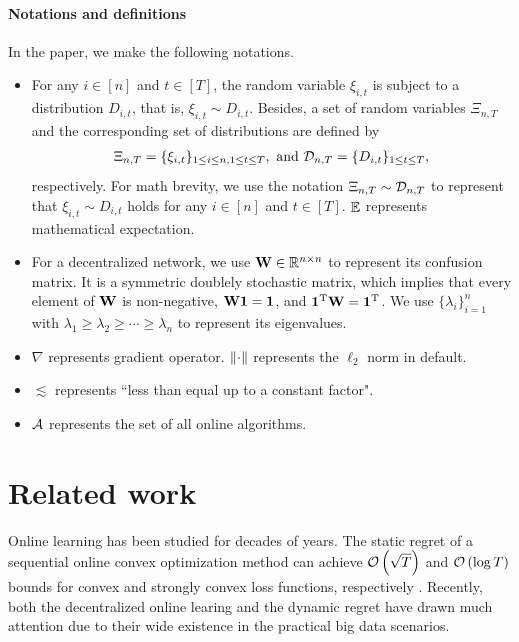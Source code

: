 \documentclass{article}
\begin{document}
\paragraph{Notations and definitions}
In the paper, we make the following notations.
\begin{itemize}
\item For any $i\in[n]$ and $t\in[T]$, the random variable $\xi_{i,t}$ is subject to a distribution $D_{i,t}$, that is, $\xi_{i,t} \sim D_{i,t}$. Besides, a set of random variables $\Xi_{n,T}$ and the corresponding set of distributions are defined by
\begin{align}
\nonumber
\Xi_{n,T} = \{ \xi_{i,t} \}_{1\le i \le n, 1 \le t \le T}, \text{~and~} \mathcal{D}_{n,T} = \{ D_{i,t} \}_{1 \le t \le T},
\end{align} respectively. For math brevity, we use the notation $\Xi_{n,T} \sim \mathcal{D}_{n,T}$ to represent that $\xi_{i,t} \sim D_{i,t}$ holds for any $i\in[n]$ and $t\in[T]$. $\mathop{\mathbb{E}}$ represents mathematical expectation.
\item For a decentralized network, we use ${\bf W} \in\mathbb{R}^{n\times n}$ to represent its confusion matrix. It is a symmetric doublely stochastic matrix, which implies that every element of ${\bf W}$ is non-negative, ${\bf W} {\bf 1} = {\bf 1}$, and ${\bf 1}^{\rm T}{\bf W}  = {\bf 1}^{\rm T}$. We use $\{\lambda_i\}_{i=1}^n$ with $\lambda_1 \ge \lambda_2 \ge \cdots \ge \lambda_n$ to represent its eigenvalues. 
\item $\nabla$ represents gradient operator. $\left\lVert\cdot\right\rVert$ represents the $\ell_2$ norm in default.
\item $\lesssim$ represents ``less than equal up to a constant factor".
\item ${\mathcal{A}}$ represents the set of all online algorithms.
\end{itemize} 
    











\section{Related work}
\label{sect_related_work}
Online learning has been studied for decades of years. The static regret of a sequential online convex optimization method can achieve ${\mathcal{O}\left( \sqrt{T} \right)}$ and ${\mathcal{O}\left( \log T \right)}$ bounds for convex and strongly convex loss functions, respectively \citep{Hazan2016Introduction,ShalevShwartz:2012dz,introduction-online-optimization}. Recently, both the decentralized online learing and the dynamic regret have drawn much attention due to their wide existence in the practical big data scenarios.
\end{document}
